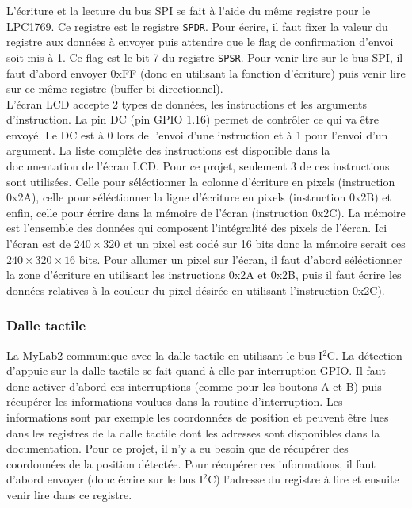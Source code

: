 \documentclass[a4paper]{article}
\begin{document}
L'écriture et la lecture du bus SPI se fait à l'aide du même registre pour le
LPC1769. Ce registre est le registre  \texttt{SPDR}. Pour écrire,
il faut fixer la valeur du registre aux données à envoyer puis attendre que le flag
de confirmation d'envoi soit mis à 1. Ce flag est le bit 7 du registre \texttt{SPSR}.
\newline
Pour venir lire sur le bus SPI, il faut d'abord envoyer 0xFF (donc en utilisant
la fonction d'écriture) puis venir lire sur ce même registre (buffer bi-directionnel). \\

L'écran LCD accepte 2 types de données, les instructions et les arguments
d'instruction. La pin DC (pin GPIO 1.16) permet de contrôler ce qui va être envoyé.
Le DC est à 0 lors de l'envoi d'une instruction et à 1 pour l'envoi d'un argument.
La liste complète des instructions est disponible dans la documentation de l'écran
LCD. Pour ce projet, seulement 3 de ces instructions sont utilisées. Celle pour séléctionner
la colonne d'écriture en pixels (instruction 0x2A), celle pour séléctionner la ligne
d'écriture en pixels (instruction 0x2B) et enfin, celle pour écrire dans la mémoire
de l'écran (instruction 0x2C). La mémoire est l'ensemble des données qui composent
l'intégralité des pixels de l'écran. Ici l'écran est de $240 \times 320$ et un pixel
est codé sur 16 bits donc la mémoire serait ces $240 \times 320 \times 16$ bits.
Pour allumer un pixel sur l'écran, il faut d'abord séléctionner la zone d'écriture
en utilisant les instructions 0x2A et 0x2B, puis il faut écrire les données relatives 
à la couleur du pixel désirée en utilisant l'instruction 0x2C).

\subsubsection{Dalle tactile}
La MyLab2 communique avec la dalle tactile en utilisant le bus I$^2$C. La détection 
d'appuie sur la dalle tactile se fait quand à elle par interruption GPIO. Il faut
donc activer d'abord ces interruptions (comme pour les boutons A et B) puis récupérer 
les informations voulues dans la routine d'interruption. Les informations sont par 
exemple les coordonnées de position et peuvent être lues dans les registres de la 
dalle tactile dont les adresses sont disponibles dans la documentation. Pour ce projet, 
il n'y a eu besoin que de récupérer des coordonnées de la position détectée. Pour
récupérer  ces informations, il faut d'abord envoyer (donc écrire sur le bus I$^2$C)
l'adresse du registre à lire et ensuite venir lire dans ce registre. \\
\end{document}
